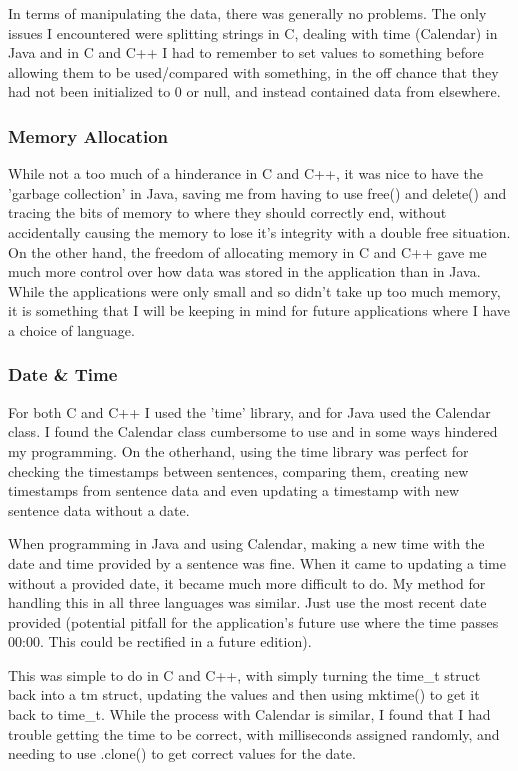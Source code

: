 \documentclass{article}
\begin{document}
In terms of manipulating the data, there was generally no problems. The only issues I encountered were splitting strings in C, dealing with time (Calendar) in Java and in C and C++ I had to remember to set values to something before allowing them to be used/compared with something, in the off chance that they had not been initialized to 0 or null, and instead contained data from elsewhere.

\subsubsection{Memory Allocation}

While not a too much of a hinderance in C and C++, it was nice to have the 'garbage collection' in Java, saving me from having to use free() and delete() and tracing the bits of memory to where they should correctly end, without accidentally causing the memory to lose it's integrity with a double free situation. On the other hand, the freedom of allocating memory in C and C++ gave me much more control over how data was stored in the application than in Java. While the applications were only small and so didn't take up too much memory, it is something that I will be keeping in mind for future applications where I have a choice of language.

\subsubsection{Date \& Time}

For both C and C++ I used the 'time' library\cite{time}, and for Java used the Calendar class. I found the Calendar class cumbersome to use and in some ways hindered my programming. On the otherhand, using the time library was perfect for checking the timestamps between sentences, comparing them, creating new timestamps from sentence data and even updating a timestamp with new sentence data without a date. 

When programming in Java and using Calendar, making a new time with the date and time provided by a sentence was fine. When it came to updating a time without a provided date, it became much more difficult to do. My method for handling this in all three languages was similar. Just use the most recent date provided (potential pitfall for the application's future use where the time passes 00:00. This could be rectified in a future edition). 

This was simple to do in C and C++, with simply turning the time\_t struct back into a tm struct, updating the values and then using mktime() to get it back to time\_t. While the process with Calendar is similar, I found that I had trouble getting the time to be correct, with milliseconds assigned randomly, and needing to use .clone() to get correct values for the date.
\end{document}
